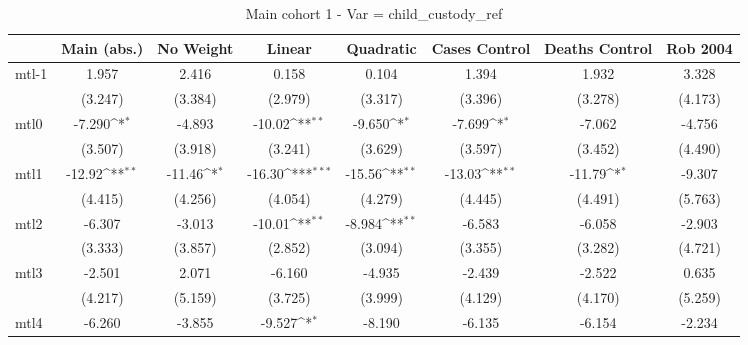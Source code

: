 \documentclass{article}
\begin{document}
{
\def\sym#1{\ifmmode^{#1}\else\(^{#1}\)\fi}
\begin{longtable}{l*{7}{c}}
\caption{Main cohort 1 - Var = child\_custody\_ref}\\
\hline\hline\endfirsthead\hline\endhead\hline\endfoot\endlastfoot
                &\multicolumn{1}{c}{Main (abs.)}&\multicolumn{1}{c}{No Weight}&\multicolumn{1}{c}{Linear}&\multicolumn{1}{c}{Quadratic}&\multicolumn{1}{c}{Cases Control}&\multicolumn{1}{c}{Deaths Control}&\multicolumn{1}{c}{Rob 2004}\\
\hline
mtl-1           &    1.957         &    2.416         &    0.158         &    0.104         &    1.394         &    1.932         &    3.328         \\
                &  (3.247)         &  (3.384)         &  (2.979)         &  (3.317)         &  (3.396)         &  (3.278)         &  (4.173)         \\
mtl0            &   -7.290\sym{*}  &   -4.893         &   -10.02\sym{**} &   -9.650\sym{*}  &   -7.699\sym{*}  &   -7.062         &   -4.756         \\
                &  (3.507)         &  (3.918)         &  (3.241)         &  (3.629)         &  (3.597)         &  (3.452)         &  (4.490)         \\
mtl1            &   -12.92\sym{**} &   -11.46\sym{*}  &   -16.30\sym{***}&   -15.56\sym{**} &   -13.03\sym{**} &   -11.79\sym{*}  &   -9.307         \\
                &  (4.415)         &  (4.256)         &  (4.054)         &  (4.279)         &  (4.445)         &  (4.491)         &  (5.763)         \\
mtl2            &   -6.307         &   -3.013         &   -10.01\sym{**} &   -8.984\sym{**} &   -6.583         &   -6.058         &   -2.903         \\
                &  (3.333)         &  (3.857)         &  (2.852)         &  (3.094)         &  (3.355)         &  (3.282)         &  (4.721)         \\
mtl3            &   -2.501         &    2.071         &   -6.160         &   -4.935         &   -2.439         &   -2.522         &    0.635         \\
                &  (4.217)         &  (5.159)         &  (3.725)         &  (3.999)         &  (4.129)         &  (4.170)         &  (5.259)         \\
mtl4            &   -6.260         &   -3.855         &   -9.527\sym{*}  &   -8.190         &   -6.135         &   -6.154         &   -2.234         \\

\end{longtable}}
\end{document}
